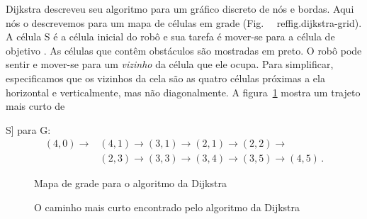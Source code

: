 Dijkstra descreveu seu algoritmo para um gráfico discreto de nós e bordas. Aqui nós o descrevemos para um mapa de células em grade (Fig.~ ~ref{fig.dijkstra-grid}). A célula {S} é a célula inicial do robô e sua tarefa é mover-se para a célula de objetivo . As células que contêm obstáculos são mostradas em preto. O robô pode sentir e mover-se para um \emph{vizinho} da célula  que ele ocupa. Para simplificar, especificamos que os vizinhos da cela são as quatro células próximas a ela horizontal e verticalmente, mas não diagonalmente. A figura~\ref{fig.dijkstra-path} mostra um trajeto mais curto de {S] para {G}:
\[
\begin{array}{ll}
(4,0) \rightarrow &(4,1)\rightarrow (3,1) \rightarrow (2,1) \rightarrow (2,2) \rightarrow \\
&(2,3) \rightarrow (3,3) \rightarrow (3,4) \rightarrow (3,5) \rightarrow (4,5)\,.
\end{array}
\]

\begin{figure}
\begin{minipage}{.5\textwidth}
\caption{Mapa de grade para o algoritmo da Dijkstra}
\label{fig.dijkstra-grid}
\end{minipage}
\hspace{\fill}
\begin{minipage}{.5\textwidth}
\caption{O caminho mais curto encontrado pelo algoritmo da Dijkstra}
\label{fig.dijkstra-path}
\end{minipage}
\end{figure}

}
